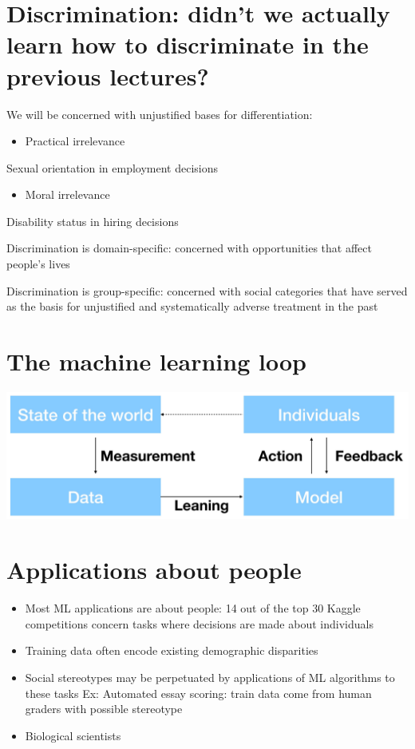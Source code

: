 \documentclass[10pt]{article}
\begin{document}
\section*{Discrimination: didn't we actually learn how to discriminate in the previous lectures?}
We will be concerned with unjustified bases for differentiation:

\begin{itemize}
  \item Practical irrelevance
\end{itemize}

Sexual orientation in employment decisions

\begin{itemize}
  \item Moral irrelevance
\end{itemize}

Disability status in hiring decisions

Discrimination is domain-specific: concerned with opportunities that affect people's lives

Discrimination is group-specific: concerned with social categories that have served as the basis for unjustified and systematically adverse treatment in the past

\section*{The machine learning loop}
\begin{center}
\includegraphics[max width=\textwidth]{2024_01_08_7c1a383b1e6170f910e4g-09}
\end{center}

\section*{Applications about people}
\begin{itemize}
  \item Most ML applications are about people: 14 out of the top 30 Kaggle competitions concern tasks where decisions are made about individuals

  \item Training data often encode existing demographic disparities

  \item Social stereotypes may be perpetuated by applications of ML algorithms to these tasks Ex: Automated essay scoring: train data come from human graders with possible stereotype

  \item Biological scientists

\end{itemize}
\end{document}
